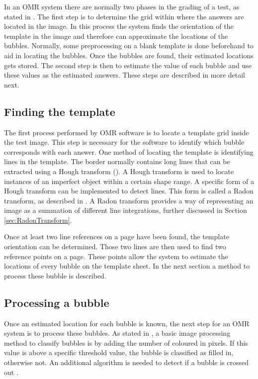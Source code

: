 In an OMR system there are normally two phases in the grading of a test, as stated in \citet{DraganI2003}. The first step is to determine the grid within where the answers are located in the image. In this process the system finds the orientation of the template in the image and therefore can approximate the locations of the bubbles. Normally, some preprocessing on a blank template is done beforehand to aid in locating the bubbles. Once the bubbles are found, their estimated locations gets stored. The second step is then to estimate the value of each bubble and use these values as the estimated answers. These steps are described in more detail next.

\subsection{Finding the template}

The first process performed by OMR software is to locate a template grid inside the test image. This step is necessary for the software to identify which bubble corresponds with each answer. One method of locating the template is identifying lines in the template. The border normally contains long lines that can be extracted using a Hough transform (\citet{MVGI2015}). A Hough transform is used to locate instances of an imperfect object within a certain shape range. A specific form of a Hough transform can be implemented to detect lines. This form is called a Radon transform, as described in \citet{MathWorks}. A Radon transform provides a way of representing an image as a summation of different line integrations, further discussed in Section \ref{sec:RadonTransform}. 

Once at least two line references on a page have been found, the template orientation can be determined. Those two lines are then used to find two reference points on a page. These points allow the system to estimate the locations of every bubble on the template sheet. In the next section a method to process these bubble is described.

\subsection{Processing a bubble}

Once an estimated location for each bubble is known, the next step for an OMR system is to process these bubbles. As stated in \citet{MVGI2015}, a basic image processing method to classify bubbles is by adding the number of coloured in pixels. If this value is above a specific threshold value, the bubble is classified as filled in, otherwise not. An additional algorithm is needed to detect if a bubble is crossed out .

